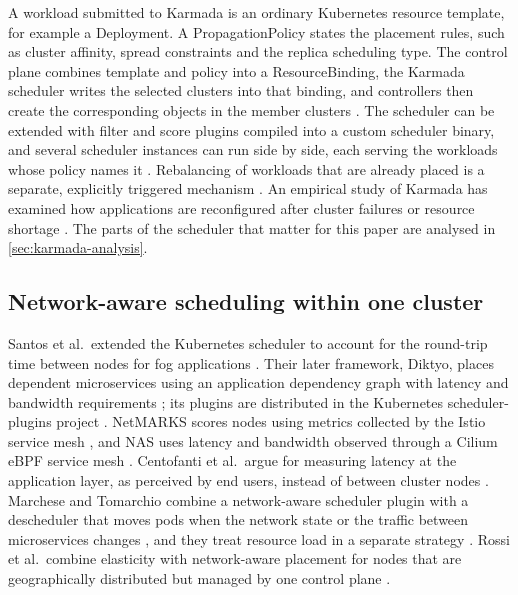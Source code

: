 A workload submitted to Karmada is an ordinary Kubernetes resource template, for example a Deployment. A PropagationPolicy states the placement rules, such as cluster affinity, spread constraints and the replica scheduling type. The control plane combines template and policy into a ResourceBinding, the Karmada scheduler writes the selected clusters into that binding, and controllers then create the corresponding objects in the member clusters \cite{karmada_docs_architecture}. The scheduler can be extended with filter and score plugins compiled into a custom scheduler binary, and several scheduler instances can run side by side, each serving the workloads whose policy names it \cite{karmada_docs_custom_scheduler}. Rebalancing of workloads that are already placed is a separate, explicitly triggered mechanism \cite{karmada_docs_rebalancer}. An empirical study of Karmada has examined how applications are reconfigured after cluster failures or resource shortage \cite{patino2025reconfiguration}. The parts of the scheduler that matter for this paper are analysed in \cref{sec:karmada-analysis}.

\subsection{Network-aware scheduling within one cluster}\label{sec:related-node}

Santos et al.\ extended the Kubernetes scheduler to account for the round-trip time between nodes for fog applications \cite{santos2019networkaware}. Their later framework, Diktyo, places dependent microservices using an application dependency graph with latency and bandwidth requirements \cite{santos2023diktyo}; its plugins are distributed in the Kubernetes scheduler-plugins project \cite{schedulerplugins_networkaware}. NetMARKS scores nodes using metrics collected by the Istio service mesh \cite{wojciechowski2021netmarks}, and NAS uses latency and bandwidth observed through a Cilium eBPF service mesh \cite{ragavan2025nas}. Centofanti et al.\ argue for measuring latency at the application layer, as perceived by end users, instead of between cluster nodes \cite{centofanti2023latency}. Marchese and Tomarchio combine a network-aware scheduler plugin with a descheduler that moves pods when the network state or the traffic between microservices changes \cite{marchese2022ccgrid}, and they treat resource load in a separate strategy \cite{marchese2025loadaware}. Rossi et al.\ combine elasticity with network-aware placement for nodes that are geographically distributed but managed by one control plane \cite{rossi2020gekube}.

